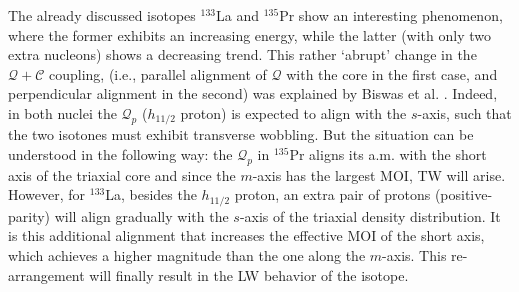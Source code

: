 The already discussed isotopes $^{133}$La and $^{135}$Pr show an interesting phenomenon, where the former exhibits an increasing energy, while the latter (with only two extra nucleons) shows a decreasing trend. This rather `abrupt' change in the $\mathcal{Q}+\mathscr{C}$ coupling, (i.e., parallel alignment of $\mathcal{Q}$ with the core in the first case, and perpendicular alignment in the second) was explained by Biswas et al. \cite{biswas2019longitudinal}. Indeed, in both nuclei the $\mathcal{Q}_p$ ($h_{11/2}$ proton) is expected to align with the $s$-axis, such that the two isotones must exhibit transverse wobbling. But the situation can be understood in the following way: the $\mathcal{Q}_p$ in $^{135}$Pr aligns its a.m. with the short axis of the triaxial core and since the $m$-axis has the largest MOI, TW will arise. However, for $^{133}$La, besides the $h_{11/2}$ proton, an extra pair of protons (positive-parity) will align gradually with the $s$-axis of the triaxial density distribution. It is this additional alignment that increases the effective MOI of the short axis, which achieves a higher magnitude than the one along the $m$-axis. This re-arrangement will finally result in the LW behavior of the isotope.

